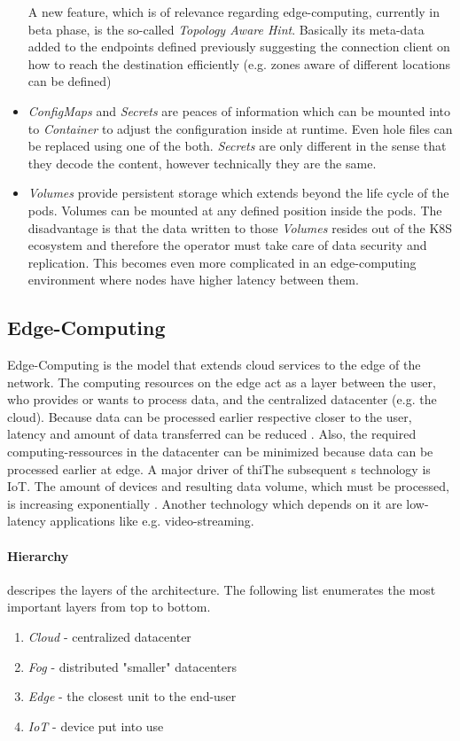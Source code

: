 \documentclass[MSC,Master,english]{twbook}%
\begin{document}
\begin{itemize}
    A new feature, which is of relevance regarding edge-computing, currently in beta phase, is the so-called \textit{Topology Aware Hint}. Basically its meta-data added to the endpoints defined previously suggesting the connection client on how to reach the destination efficiently (e.g. zones aware of different locations can be defined)
    \item \textit{ConfigMaps} and \textit{Secrets} are peaces of information which can be mounted into to \textit{Container} to adjust the configuration inside at runtime. Even hole files can be replaced using one of the both. \textit{Secrets} are only different in the sense that they decode the content, however technically they are the same.
    \item \textit{Volumes} provide persistent storage which extends beyond the life cycle of the pods. Volumes can be mounted at any defined position inside the pods. The disadvantage is that the data written to those \textit{Volumes} resides out of the \ac{K8S} ecosystem and therefore the operator must take care of data security and replication. This becomes even more complicated in an edge-computing environment where nodes have higher latency between them.
\end{itemize}

\subsection{Edge-Computing}
Edge-Computing is the model that extends cloud services to the edge of the
network. The computing resources on the edge act as a layer between the user, who provides or wants to process data, and the centralized datacenter (e.g. the cloud). Because data can be processed earlier respective closer to the user, latency and amount of data transferred can be reduced \cite{intro-edge}. Also, the required computing-ressources in the datacenter can be minimized because data can be processed earlier at edge. A major driver of thiThe subsequent s technology is \ac{IoT}. The amount of devices and resulting data volume, which must be processed, is increasing exponentially \cite{SotE21}. Another technology which depends on it are low-latency applications like e.g. video-streaming. 

\paragraph{Hierarchy} descripes the layers of the architecture. The following list enumerates the most important layers from top to bottom\cite{intro-edge}.
\begin{enumerate}
    \item \textit{Cloud} - centralized datacenter
    \item \textit{Fog} - distributed "smaller" datacenters
    \item \textit{Edge} - the closest unit to the end-user
    \item \textit{\ac{IoT}} - device put into use
\end{enumerate}
\end{document}
